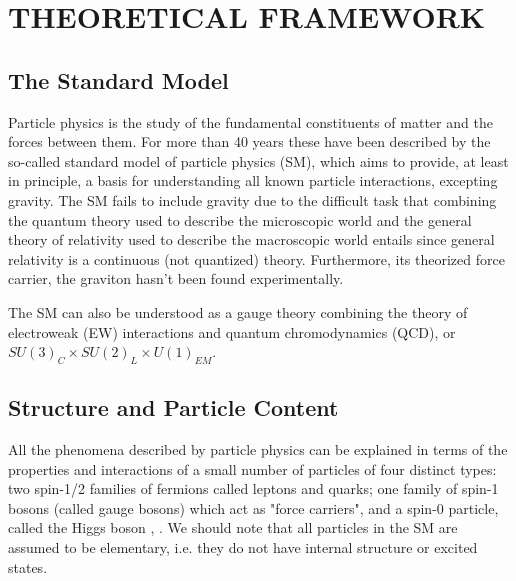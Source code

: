 %
%
%
%



\chapter{THEORETICAL FRAMEWORK}
\section{The Standard Model}
Particle physics is the study of the fundamental constituents of matter and the forces between them. For more than 40 years these have been described by the so-called standard model of particle physics (SM), which aims to provide, at least in principle, a basis for understanding all known particle interactions, excepting gravity. The SM fails to include gravity due to the difficult task that combining the quantum theory used to describe the microscopic world and the general theory of relativity used to describe the macroscopic world entails since general relativity is a continuous (not quantized) theory. Furthermore, its theorized force carrier, the graviton hasn't been found experimentally.

The SM can also be understood as a gauge theory combining the theory of electroweak (EW) interactions and quantum chromodynamics (QCD), or $SU(3)_{C}\times SU(2)_{L} \times U(1)_{EM}$. 

\section{Structure and Particle Content}
All the phenomena described by particle physics can be explained in terms of the properties and interactions of a small number of particles of four distinct types: two spin-1/2 families of fermions called leptons and quarks; one family of spin-1 bosons (called gauge bosons) which act as "force carriers", and a spin-0 particle, called the Higgs boson \cite{20121}, \cite{201230}. We should note that all particles in the SM are assumed to be elementary, i.e. they do not have internal structure or excited states.

